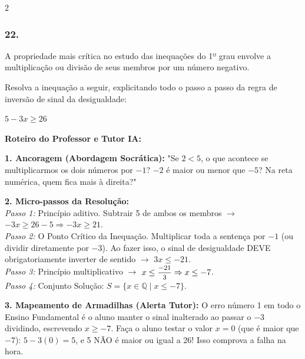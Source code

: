 \begin{multicols*}{2}
\subsubsection*{22.} 
\begin{enunciadoLiteral}
A propriedade mais crítica no estudo das inequações do 1º grau envolve a multiplicação ou divisão de seus membros por um número negativo.

Resolva a inequação a seguir, explicitando todo o passo a passo da regra de inversão de sinal da desigualdade:

$ 5 - 3x \ge 26 $
\end{enunciadoLiteral}

\ifgabarito
    \begin{tcolorbox}[colback=CorTitUm!5, colframe=CorTitUm, boxrule=1pt, arc=4pt, left=6pt, right=6pt, top=6pt, bottom=6pt]
    \small\textbf{\textcolor{CorTitUm}{Roteiro do Professor e Tutor IA:}}\par\vspace{0.1cm}
    \color{CinzaEscuro}
    \textbf{1. Ancoragem (Abordagem Socrática):} "Se $2 < 5$, o que acontece se multiplicarmos os dois números por $-1$? $-2$ é maior ou menor que $-5$? Na reta numérica, quem fica mais à direita?"\par\vspace{0.1cm}
    
    \textbf{2. Micro-passos da Resolução:}\\
    \textit{Passo 1:} Princípio aditivo. Subtrair 5 de ambos os membros $\rightarrow$ $-3x \ge 26 - 5 \Rightarrow -3x \ge 21$.\\
    \textit{Passo 2:} O Ponto Crítico da Inequação. Multiplicar toda a sentença por $-1$ (ou dividir diretamente por $-3$). Ao fazer isso, o sinal de desigualdade DEVE obrigatoriamente inverter de sentido $\rightarrow$ $3x \le -21$.\\
    \textit{Passo 3:} Princípio multiplicativo $\rightarrow$ $x \le \mfrac{-21}{3} \Rightarrow x \le -7$.\\
    \textit{Passo 4:} Conjunto Solução: $S = \{x \in \mathbb{Q} \mid x \le -7\}$.\par\vspace{0.1cm}
    
    \textbf{3. Mapeamento de Armadilhas (Alerta Tutor):} O erro número 1 em todo o Ensino Fundamental é o aluno manter o sinal inalterado ao passar o $-3$ dividindo, escrevendo $x \ge -7$. Faça o aluno testar o valor $x = 0$ (que é maior que $-7$): $5 - 3(0) = 5$, e 5 NÃO é maior ou igual a 26! Isso comprova a falha na hora.
    \end{tcolorbox}
    \vspace{0.15cm}
    

\end{multicols*}
